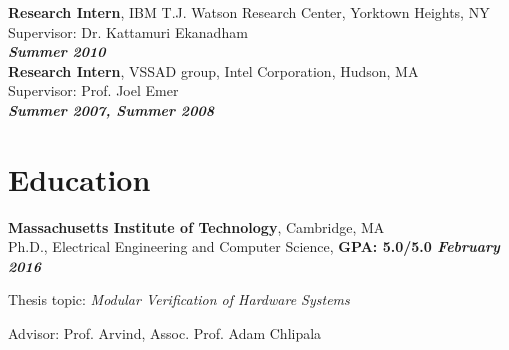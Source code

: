 \documentclass[margin]{resume}
\begin{document}
\begin{resume}
    \textbf{Research Intern}, IBM T.J. Watson Research Center, Yorktown Heights, NY\\ 
    Supervisor: Dr. Kattamuri Ekanadham \\
\hfill \textbf{\textit{Summer 2010}}\\

    \textbf{Research Intern}, VSSAD group, Intel Corporation, Hudson, MA\\
    Supervisor: Prof. Joel Emer \\
\hfill \textbf{\textit{Summer 2007, Summer 2008}}\\
    \section{\mysidestyle Education}
    \textbf{Massachusetts Institute of Technology}, Cambridge, MA \\
    Ph.D., Electrical Engineering and Computer Science, \hfill \textbf{GPA: 5.0/5.0 \textit{February 2016}}\\
    \begin{list2}
        \item Thesis topic: \textit{Modular Verification of Hardware Systems}
        \item Advisor:  Prof. Arvind, Assoc. Prof. Adam Chlipala


\end{list2}
\end{resume}
\end{document}
